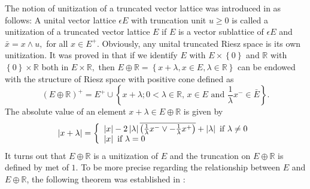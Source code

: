 \documentclass{birkau}
\numberwithin{equation}{section}
\theoremstyle{plain}
\theoremstyle{definition}
\begin{document}
The notion of unitization of a truncated vector lattice was introduced in
\cite{bouhafsimahfoudhi} as follows: A unital vector lattice $\epsilon E$ with truncation unit
$u\geq0$ is called a unitization of a truncated vector lattice $E$ if $E$ is a
vector sublattice of $\epsilon E$ and $\bar{x}=x\wedge u,$ for all $x\in
E^{+}.$ Obviously, any unital truncated Riesz space is its own unitization. It
was proved in \cite{BoulaChiheb} that if we identify $E$ with $E\times\left\{
0\right\}  $ and $%
\mathbb{R}
$ with $\left\{  0\right\}  \times%
\mathbb{R}
$ both in $E\times%
\mathbb{R}
,$ then $E\oplus%
\mathbb{R}
=\left\{  x+\lambda,x\in E,\lambda\in%
\mathbb{R}
\right\}  $ can be endowed with the structure of Riesz space with positive
cone defined as%
\[
\left(  E\oplus%
\mathbb{R}
\right)  ^{+}=E^{+}\cup\left\{  x+\lambda;0<\lambda\in%
\mathbb{R}
\text{, }x\in E\text{ and }\frac{1}{\lambda}x^{-}\in\bar{E}\right\}  .
\]
The absolute value of an element $x+\lambda\in E\oplus%
\mathbb{R}
$ is given by%
\[
\left\vert x+\lambda\right\vert =\left\{
\begin{array}
	[c]{l}%
	\left\vert x\right\vert -2\left\vert \lambda\right\vert \overline{\left(
		\frac{1}{\lambda}x^{-}\vee-\frac{1}{\lambda}x^{+}\right)  }+\left\vert
	\lambda\right\vert \text{ if }\lambda\neq0\\
	\left\vert x\right\vert \text{ if }\lambda=0
\end{array}
\right.
\]
It turns out that $E\oplus%
\mathbb{R}
$ is a unitization of $E$ and the truncation on $E\oplus%
\mathbb{R}
$ is defined by met of $1.$
\bigskip To be more precise regarding the relationship between $E$ and
$E\oplus%
\mathbb{R}
$,  the following theorem was established in \cite{bouhafsimahfoudhi}:
\end{document}
